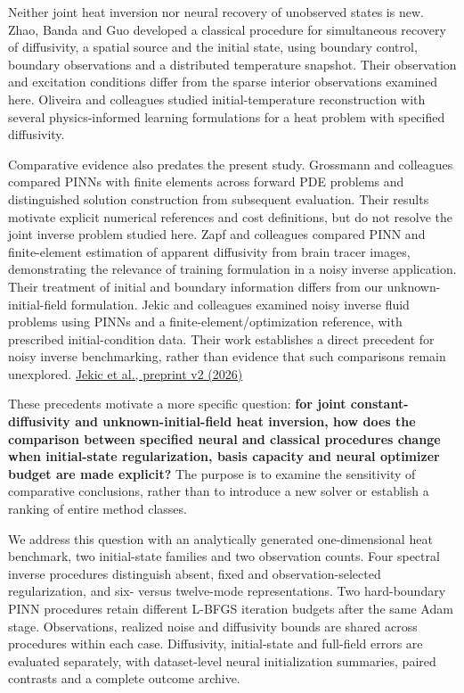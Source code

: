 \documentclass[10pt,a4paper]{article}
\begin{document}
Neither joint heat inversion nor neural recovery of unobserved states is new.
Zhao, Banda and Guo developed a classical procedure for simultaneous recovery
of diffusivity, a spatial source and the initial state, using boundary control,
boundary observations and a distributed temperature snapshot. Their observation
and excitation conditions differ from the sparse interior observations examined
here. \cite{zhao2017}
Oliveira and colleagues studied initial-temperature reconstruction with several
physics-informed learning formulations for a heat problem with specified
diffusivity. \cite{oliveira2026}

Comparative evidence also predates the present study. Grossmann and colleagues
compared PINNs with finite elements across forward PDE problems and distinguished
solution construction from subsequent evaluation. Their results motivate explicit
numerical references and cost definitions, but do not resolve the joint inverse
problem studied here. \cite{grossmann2024}
Zapf and colleagues compared PINN and finite-element estimation of apparent
diffusivity from brain tracer images, demonstrating the relevance of training
formulation in a noisy inverse application. Their treatment of initial and
boundary information differs from our unknown-initial-field formulation.
\cite{zapf2022}
Jekic and colleagues examined noisy inverse fluid problems using PINNs and a
finite-element/optimization reference, with prescribed initial-condition data.
Their work establishes a direct precedent for noisy inverse benchmarking, rather
than evidence that such comparisons remain unexplored.
\href{https://arxiv.org/html/2509.20191v2}{Jekic et al., preprint v2 (2026)}

These precedents motivate a more specific question: \textbf{for joint constant-
diffusivity and unknown-initial-field heat inversion, how does the comparison
between specified neural and classical procedures change when initial-state
regularization, basis capacity and neural optimizer budget are made explicit?}
The purpose is to examine the sensitivity of comparative conclusions, rather
than to introduce a new solver or establish a ranking of entire method classes.

We address this question with an analytically generated one-dimensional heat
benchmark, two initial-state families and two observation counts. Four spectral
inverse procedures distinguish absent, fixed and observation-selected
regularization, and six- versus twelve-mode representations. Two hard-boundary
PINN procedures retain different L-BFGS iteration budgets after the same Adam
stage. Observations, realized noise and diffusivity bounds are shared across
procedures within each case. Diffusivity, initial-state and full-field errors
are evaluated separately, with dataset-level neural initialization summaries,
paired contrasts and a complete outcome archive.
\end{document}
